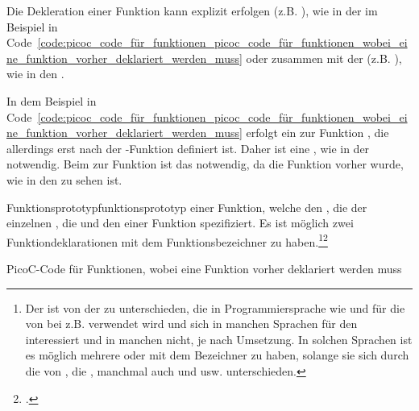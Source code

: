 Die Dekleration einer Funktion kann explizit erfolgen (z.B. ), wie in der im Beispiel in Code~\ref{code:picoc_code_für_funktionen_picoc_code_für_funktionen_wobei_eine_funktion_vorher_deklariert_werden_muss}   oder zusammen mit der  (z.B. ), wie in den  .

In dem Beispiel in Code~\ref{code:picoc_code_für_funktionen_picoc_code_für_funktionen_wobei_eine_funktion_vorher_deklariert_werden_muss} erfolgt ein  zur Funktion , die allerdings erst nach der -Funktion definiert ist. Daher ist eine , wie in der   notwendig. Beim  zur Funktion  ist das  notwendig, da die Funktion vorher  wurde, wie in den   zu sehen ist.

\begin{Definition}{Funktionsprototyp}{funktionsprototyp}
   einer Funktion, welche den , die  der einzelnen , die  und den  einer Funktion spezifiziert. Es ist  möglich zwei Funktiondeklarationen mit dem  Funktionsbezeichner zu haben.\footnote{Der  ist von der  zu unterschieden, die in Programmiersprache wie  und  für die  von  bei z.B.  verwendet wird und sich in manchen Sprachen für den  interessiert und in manchen nicht, je nach Umsetzung. In solchen Sprachen ist es möglich mehrere  oder  mit dem  Bezeichner zu haben, solange sie sich durch die  von , die , manchmal auch  und  usw. unterschieden.}\footcite{noauthor_what_nodate-4}
\end{Definition}

\begin{code}
  \centering
  \caption{PicoC-Code für Funktionen, wobei eine Funktion vorher deklariert werden muss}
  \label{code:picoc_code_für_funktionen_picoc_code_für_funktionen_wobei_eine_funktion_vorher_deklariert_werden_muss}
\end{code}

